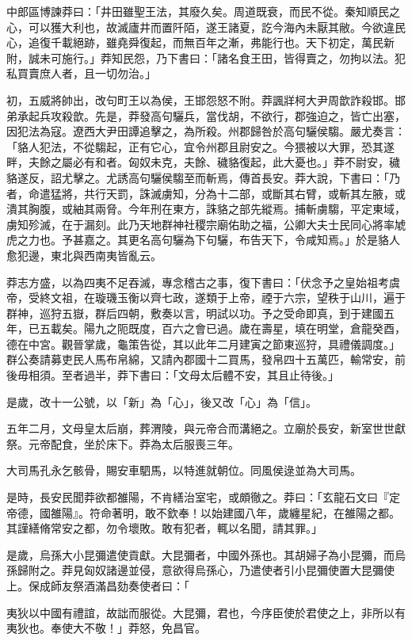 \begin{pinyinscope}
中郎區博諫莽曰：「井田雖聖王法，其廢久矣。周道既衰，而民不從。秦知順民之心，可以獲大利也，故滅廬井而置阡陌，遂王諸夏，訖今海內未厭其敝。今欲違民心，追復千載絕跡，雖堯舜復起，而無百年之漸，弗能行也。天下初定，萬民新附，誠未可施行。」莽知民怨，乃下書曰：「諸名食王田，皆得賣之，勿拘以法。犯私買賣庶人者，且一切勿治。」

初，五威將帥出，改句町王以為侯，王邯怨怒不附。莽諷牂柯大尹周歆詐殺邯。邯弟承起兵攻殺歆。先是，莽發高句驪兵，當伐胡，不欲行，郡強迫之，皆亡出塞，因犯法為寇。遼西大尹田譚追擊之，為所殺。州郡歸咎於高句驪侯騶。嚴尤奏言：「貉人犯法，不從騶起，正有它心，宜令州郡且尉安之。今猥被以大罪，恐其遂畔，夫餘之屬必有和者。匈奴未克，夫餘、穢貉復起，此大憂也。」莽不尉安，穢貉遂反，詔尤擊之。尤誘高句驪侯騶至而斬焉，傳首長安。莽大說，下書曰：「乃者，命遣猛將，共行天罰，誅滅虜知，分為十二部，或斷其右臂，或斬其左腋，或潰其胸腹，或紬其兩脅。今年刑在東方，誅貉之部先縱焉。捕斬虜騶，平定東域，虜知殄滅，在于漏刻。此乃天地群神社稷宗廟佑助之福，公卿大夫士民同心將率虓虎之力也。予甚嘉之。其更名高句驪為下句驪，布告天下，令咸知焉。」於是貉人愈犯邊，東北與西南夷皆亂云。

莽志方盛，以為四夷不足吞滅，專念稽古之事，復下書曰：「伏念予之皇始祖考虞帝，受終文祖，在璇璣玉衡以齊七政，遂類于上帝，禋于六宗，望秩于山川，遍于群神，巡狩五嶽，群后四朝，敷奏以言，明試以功。予之受命即真，到于建國五年，已五載矣。陽九之阨既度，百六之會已過。歲在壽星，填在明堂，倉龍癸酉，德在中宮。觀晉掌歲，龜策告從，其以此年二月建寅之節東巡狩，具禮儀調度。」群公奏請募吏民人馬布帛綿，又請內郡國十二買馬，發帛四十五萬匹，輸常安，前後毋相須。至者過半，莽下書曰：「文母太后體不安，其且止待後。」

是歲，改十一公號，以「新」為「心」，後又改「心」為「信」。

五年二月，文母皇太后崩，葬渭陵，與元帝合而溝絕之。立廟於長安，新室世世獻祭。元帝配食，坐於床下。莽為太后服喪三年。

大司馬孔永乞骸骨，賜安車駟馬，以特進就朝位。同風侯逯並為大司馬。

是時，長安民聞莽欲都雒陽，不肯繕治室宅，或頗徹之。莽曰：「玄龍石文曰『定帝德，國雒陽』。符命著明，敢不欽奉！以始建國八年，歲纏星紀，在雒陽之都。其謹繕脩常安之都，勿令壞敗。敢有犯者，輒以名聞，請其罪。」

是歲，烏孫大小昆彌遣使貢獻。大昆彌者，中國外孫也。其胡婦子為小昆彌，而烏孫歸附之。莽見匈奴諸邊並侵，意欲得烏孫心，乃遣使者引小昆彌使置大昆彌使上。保成師友祭酒滿昌劾奏使者曰：「

夷狄以中國有禮誼，故詘而服從。大昆彌，君也，今序臣使於君使之上，非所以有夷狄也。奉使大不敬！」莽怒，免昌官。


\end{pinyinscope}
